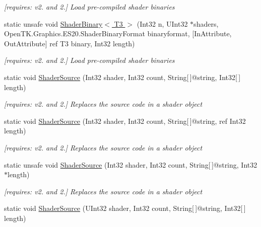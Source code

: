 \begin{DoxyCompactItemize}
\begin{DoxyCompactList}\small\item\em \mbox{[}requires\-: v2. and 2.\mbox{]} Load pre-\/compiled shader binaries \end{DoxyCompactList}\item 
static unsafe void \hyperlink{class_open_t_k_1_1_graphics_1_1_e_s20_1_1_g_l_a1dfcd81b1ae3fa308fd339004e9f5796}{Shader\-Binary$<$ T3 $>$} (Int32 n, U\-Int32 $\ast$shaders, Open\-T\-K.\-Graphics.\-E\-S20.\-Shader\-Binary\-Format binaryformat, \mbox{[}In\-Attribute, Out\-Attribute\mbox{]} ref T3 binary, Int32 length)
\begin{DoxyCompactList}\small\item\em \mbox{[}requires\-: v2. and 2.\mbox{]} Load pre-\/compiled shader binaries \end{DoxyCompactList}\item 
static void \hyperlink{class_open_t_k_1_1_graphics_1_1_e_s20_1_1_g_l_aa969fb1b594a7c1c303e85634e9d399a}{Shader\-Source} (Int32 shader, Int32 count, String\mbox{[}$\,$\mbox{]}@string, Int32\mbox{[}$\,$\mbox{]} length)
\begin{DoxyCompactList}\small\item\em \mbox{[}requires\-: v2. and 2.\mbox{]} Replaces the source code in a shader object \end{DoxyCompactList}\item 
static void \hyperlink{class_open_t_k_1_1_graphics_1_1_e_s20_1_1_g_l_a70229b566ac3e961845b8bf473e4b6e5}{Shader\-Source} (Int32 shader, Int32 count, String\mbox{[}$\,$\mbox{]}@string, ref Int32 length)
\begin{DoxyCompactList}\small\item\em \mbox{[}requires\-: v2. and 2.\mbox{]} Replaces the source code in a shader object \end{DoxyCompactList}\item 
static unsafe void \hyperlink{class_open_t_k_1_1_graphics_1_1_e_s20_1_1_g_l_a264c5b750a759301708a7de65157d447}{Shader\-Source} (Int32 shader, Int32 count, String\mbox{[}$\,$\mbox{]}@string, Int32 $\ast$length)
\begin{DoxyCompactList}\small\item\em \mbox{[}requires\-: v2. and 2.\mbox{]} Replaces the source code in a shader object \end{DoxyCompactList}\item 
static void \hyperlink{class_open_t_k_1_1_graphics_1_1_e_s20_1_1_g_l_a8cc2801bf9445e26ea347cf2a6b80eec}{Shader\-Source} (U\-Int32 shader, Int32 count, String\mbox{[}$\,$\mbox{]}@string, Int32\mbox{[}$\,$\mbox{]} length)

\end{DoxyCompactItemize}
